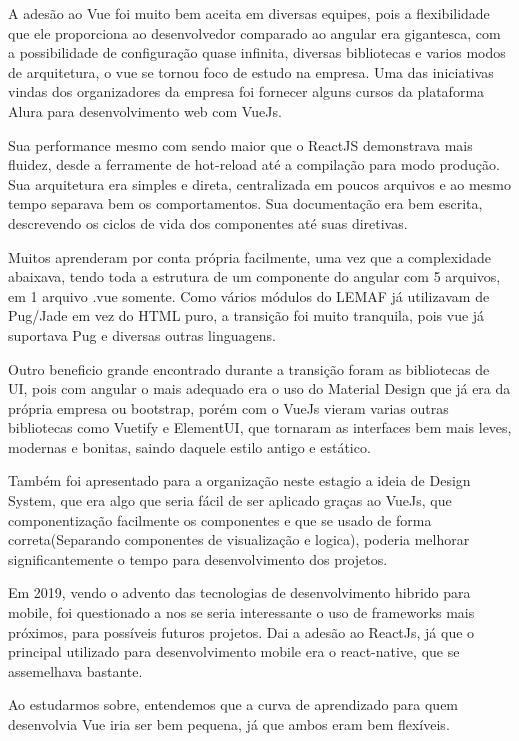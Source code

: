 A adesão ao Vue foi muito bem aceita em diversas equipes, pois a flexibilidade que ele proporciona ao desenvolvedor comparado ao angular era gigantesca, com a possibilidade de configuração quase infinita, diversas bibliotecas e varios modos de arquitetura, o vue se tornou foco de estudo na empresa.
Uma das iniciativas vindas dos organizadores da empresa foi fornecer alguns cursos da plataforma Alura para desenvolvimento web com VueJs.

Sua performance mesmo com sendo maior que o ReactJS demonstrava mais fluidez, desde a ferramente de hot-reload até a compilação para modo produção.
Sua arquitetura era simples e direta, centralizada em poucos arquivos e ao mesmo tempo separava bem os comportamentos. Sua documentação era bem escrita, descrevendo os ciclos de vida dos componentes até suas diretivas.

Muitos aprenderam por conta própria facilmente, uma vez que a complexidade abaixava, tendo toda a estrutura de um componente do angular com 5 arquivos, em 1 arquivo .vue somente.
Como vários módulos do LEMAF já utilizavam de Pug/Jade em vez do HTML puro, a transição foi muito tranquila, pois vue já suportava Pug e diversas outras linguagens.

Outro beneficio grande encontrado durante a transição foram as bibliotecas de UI, pois com angular o mais adequado era o uso do Material Design que já era da própria empresa ou 
bootstrap, porém com o VueJs vieram varias outras bibliotecas como Vuetify e ElementUI, que tornaram as interfaces bem mais leves, modernas e bonitas, saindo daquele estilo antigo e estático.

Também foi apresentado para a organização neste estagio a ideia de Design System, que era algo que seria fácil de ser aplicado graças ao VueJs, que componentização facilmente os componentes e que se usado 
de forma correta(Separando componentes de visualização e logica), poderia melhorar significantemente o tempo para desenvolvimento dos projetos.

Em 2019, vendo o advento das tecnologias de desenvolvimento hibrido para mobile, foi questionado a nos se seria interessante o uso de frameworks mais próximos, para possíveis futuros projetos.
Dai a adesão ao ReactJs, já que o principal utilizado para desenvolvimento mobile era o react-native, que se assemelhava bastante.

Ao estudarmos sobre, entendemos que a curva de aprendizado para quem desenvolvia Vue iria ser bem pequena, já que ambos eram bem flexíveis.

